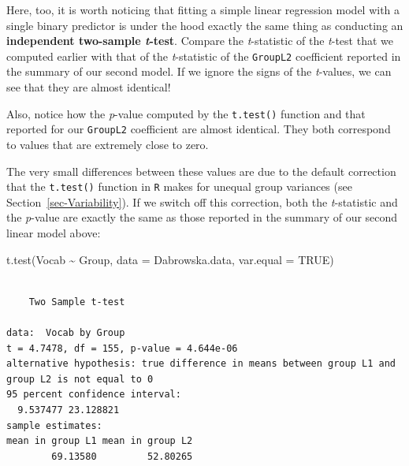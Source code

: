 \documentclass[
  letterpaper,
  DIV=11,
  numbers=noendperiod]{scrreprt}
\newenvironment{Shaded}{\begin{snugshade}}{\end{snugshade}}
\newcommand{\AttributeTok}[1]{\textcolor[rgb]{0.40,0.45,0.13}{#1}}
\newcommand{\ConstantTok}[1]{\textcolor[rgb]{0.56,0.35,0.01}{#1}}
\newcommand{\FunctionTok}[1]{\textcolor[rgb]{0.28,0.35,0.67}{#1}}
\newcommand{\NormalTok}[1]{\textcolor[rgb]{0.00,0.23,0.31}{#1}}
\newcommand{\SpecialCharTok}[1]{\textcolor[rgb]{0.37,0.37,0.37}{#1}}
\begin{document}
\begin{tcolorbox}[enhanced jigsaw, arc=.35mm, bottomrule=.15mm, bottomtitle=1mm, breakable, colback=white, colbacktitle=quarto-callout-note-color!10!white, colframe=quarto-callout-note-color-frame, coltitle=black, left=2mm, leftrule=.75mm, opacityback=0, opacitybacktitle=0.6, rightrule=.15mm, title=\textcolor{quarto-callout-note-color}{\faInfo}\hspace{0.5em}{It's (still) all linear regression!~\emoji{exploding-head}}, titlerule=0mm, toprule=.15mm, toptitle=1mm]

Here, too, it is worth noticing that fitting a simple linear regression
model with a single binary predictor is under the hood exactly the same
thing as conducting an \textbf{independent two-sample \emph{t}-test}.
Compare the \emph{t}-statistic of the \emph{t}-test that we computed
earlier with that of the \emph{t}-statistic of the \texttt{GroupL2}
coefficient reported in the summary of our second model. If we ignore
the signs of the \emph{t}-values, we can see that they are almost
identical!

Also, notice how the \emph{p}-value computed by the \texttt{t.test()}
function and that reported for our \texttt{GroupL2} coefficient are
almost identical. They both correspond to values that are extremely
close to zero.

The very small differences between these values are due to the default
correction that the \texttt{t.test()} function in \texttt{R} makes for
unequal group variances (see Section~\ref{sec-Variability}). If we
switch off this correction, both the \emph{t}-statistic and the
\emph{p}-value are exactly the same as those reported in the summary of
our second linear model above:

\begin{Shaded}
\begin{Highlighting}[]
\FunctionTok{t.test}\NormalTok{(Vocab }\SpecialCharTok{\textasciitilde{}}\NormalTok{ Group, }
       \AttributeTok{data =}\NormalTok{ Dabrowska.data,}
       \AttributeTok{var.equal =} \ConstantTok{TRUE}\NormalTok{)}
\end{Highlighting}
\end{Shaded}

\begin{verbatim}

    Two Sample t-test

data:  Vocab by Group
t = 4.7478, df = 155, p-value = 4.644e-06
alternative hypothesis: true difference in means between group L1 and group L2 is not equal to 0
95 percent confidence interval:
  9.537477 23.128821
sample estimates:
mean in group L1 mean in group L2 
        69.13580         52.80265 
\end{verbatim}

\end{tcolorbox}
\end{document}
